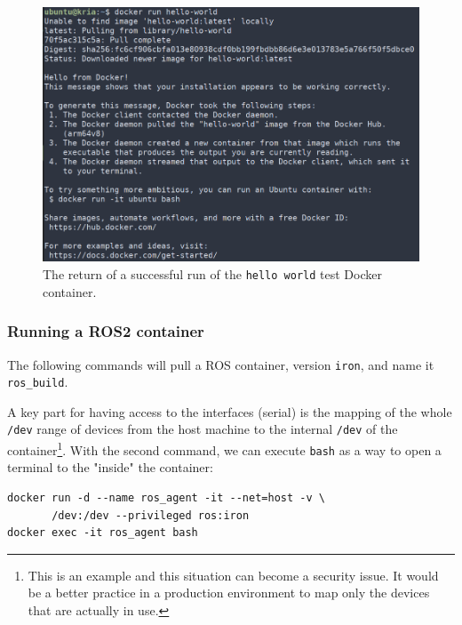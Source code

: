\documentclass[10pt]{article}
\begin{document}
\begin{figure}[htbp]
\centering
\includegraphics[width=.7\textwidth]{./img/hello-docker.png}
\caption{\label{fig:org73970c3}The return of a successful run of the \texttt{hello world} test Docker container.}
\end{figure}


\subsubsection{Running a ROS2 container}
\label{sec:org0b3fd11}
The following commands will pull a ROS container, version \texttt{iron}, and name it \texttt{ros\_build}.

A key part for having access to the interfaces (serial) is the mapping of the whole \texttt{/dev}
range of devices from the host machine to the internal \texttt{/dev} of the container\footnote{This is an example and this situation can become a security issue. It would be a better practice
in a production environment to map only the devices that are actually in use.}.
With the second command, we can execute \texttt{bash} as a way to open a terminal to the "inside" the container:
\begin{verbatim}
docker run -d --name ros_agent -it --net=host -v \
       /dev:/dev --privileged ros:iron
docker exec -it ros_agent bash
\end{verbatim}
\end{document}
